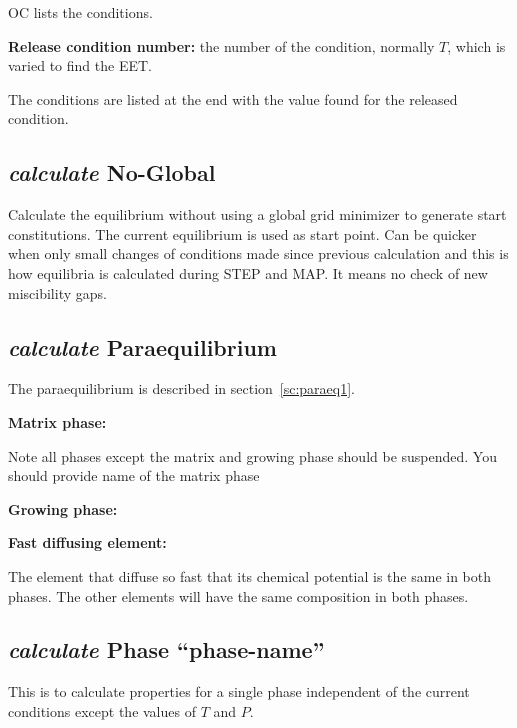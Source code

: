 \documentclass[11pt]{article}
\begin{document}
OC lists the conditions.

{\bf Release condition number:} the number of the condition, normally
$T$, which is varied to find the EET.

The conditions are listed at the end with the value found for the
released condition.

\hypertarget{Calculate no-global}{}
\subsection{{\em calculate} No-Global}

Calculate the equilibrium without using a global grid minimizer to
generate start constitutions.  The current equilibrium is used as
start point.  Can be quicker when only small changes of conditions
made since previous calculation and this is how equilibria is
calculated during STEP and MAP.  It means no check of new miscibility
gaps.

\hypertarget{Calculate paraeq}{}
\subsection{{\em calculate} Paraequilibrium}\label{sc:paraeq2}

The paraequilibrium is described in section~\ref{sc:paraeq1}.

{\bf Matrix phase:}
              
Note all phases except the matrix and growing phase should be
suspended.  You should provide name of the matrix phase

{\bf Growing phase:}

{\bf Fast diffusing element:}

The element that diffuse so fast that its chemical potential is the
same in both phases.  The other elements will have the same
composition in both phases.

\hypertarget{Calculate what for}{}
\hypertarget{Calculate phase}{}
\subsection{{\em calculate} Phase ``phase-name''}

This is to calculate properties for a single phase independent of the
current conditions except the values of $T$ and $P$.
\end{document}
